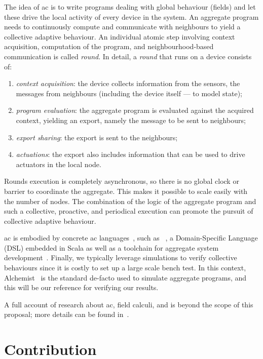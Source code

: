 \documentclass[11pt]{article}
\begin{document}
The idea of \ac{ac} is to write programs dealing with global behaviour (fields) and let these drive the local activity of every device in the system.
%
An aggregate program needs to continuously compute and communicate with neighbours to yield a collective adaptive behaviour.
%
An individual atomic step involving context acquisition, computation of the program, and neighbourhood-based communication is called \emph{round}.
%
In detail, a \emph{round} that runs on a device consists of:
\begin{enumerate}
  \item \emph{context acquisition}: the device collects information from the sensors, the messages from neighbours (including the device itself --- to model state);
  \item \emph{program evaluation}: the aggregate program is evaluated against the acquired context, yielding an export, namely the message to be sent to neighbours;
  \item \emph{export sharing}: the export is sent to the neighbours;
  \item \emph{actuations}: the export also includes information that can be used to drive actuators in the local node.
\end{enumerate}
%
Rounds execution is completely asynchronous, so there is no global clock or barrier to coordinate the aggregate. 
%
This makes it possible to scale easily with the number of nodes. 
%
The combination of the logic of the aggregate program and such a collective, proactive, and periodical execution can promote the pursuit of collective adaptive behaviour.

\ac{ac} is embodied by concrete \ac{ac} languages~\cite{viroli2019jlamp-si-coord},
 such as \scafi{}~\cite{DBLP:conf/isola/CasadeiVAD20,DBLP:journals/eaai/CasadeiVAPD21},
 a Domain-Specific Language (DSL) embedded in Scala
 as well as a toolchain for aggregate system development~\cite{Casadei2016mass}.
%
Finally, we typically leverage simulations to verify collective behaviours since it is costly to set up a large scale bench test. 
%
In this context, Alchemist~\cite{Pianini_2013} is the standard de-facto used to simulate aggregate programs, and this will be our reference for verifying our results.

A full account of research about \ac{ac}, field calculi, and \scafi{} is beyond the scope of this proposal; more details can be found in~\cite{viroli2019jlamp-si-coord,DBLP:journals/eaai/CasadeiVAPD21}.

\section{Contribution} \label{contribution}
\end{document}
